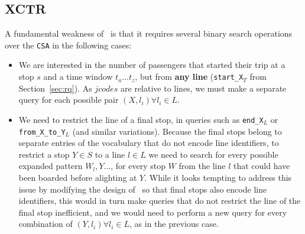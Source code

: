     \subsection{XCTR}
    A fundamental weakness of \ttctr~is that it requires several binary search operations over the \texttt{CSA} in the following cases:
    \begin{itemize}
        \item We are interested in the number of passengers that started their trip at a stop $s$ and a time window $t_a...t_z$, but from \textbf{any line} (\texttt{start\_X$_{T}$} from Section~\ref{sec:rq}). As $jcodes$ are relative to lines, we must make a separate query for each possible pair $(X, l_i) \forall l_i \in L$.
        \item We need to restrict the line of a final stop, in queries such as \texttt{end\_X$_{L}$} or \texttt{from\_X\_to\_Y$_{L}$} (and similar variations). Because the final stops belong to separate entries of the vocabulary that do not encode line identifiers, to restrict a stop $Y\in S$ to a line $l\in L$ we need to search for every possible expanded pattern $W_l,Y...$, for every stop $W$ from the line $l$ that could have been boarded before alighting at $Y$. While it looks tempting to address this issue by modifying the design of \ttctr~so that final stops also encode line identifiers, this would in turn make queries that do not restrict the line of the final stop inefficient, and we would need to perform a new query for every combination of $(Y, l_i) \forall l_i \in L$, as in the previous case. 
    \end{itemize}
    
